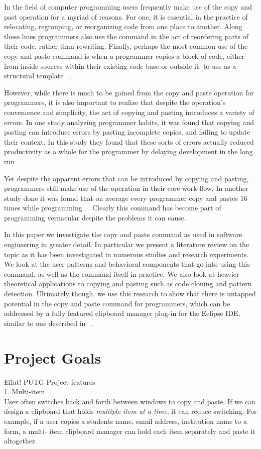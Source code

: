 \documentclass{acm_proc_article-sp}
\begin{document}
In the field of computer programming users frequently make use of the copy and past operation for a myriad of reasons. For one, it is essential in the practice of relocating, regrouping, or reorganizing code from one place to another. Along these lines programmers also use the command in the act of reordering parts of their code, rather than rewriting. Finally, perhaps the most common use of the copy and paste command is when a programmer copies a block of code, either from inside sources within their existing code base or outside it, to use as a structural template ~\cite{ooplCP}.

However, while there is much to be gained from the copy and paste operation for programmers, it is also important to realize that despite the operation's convenience and simplicity, the act of copying and pasting introduces a variety of errors. In one study analyzing programmer habits, it was found that copying and pasting can introduce errors by pasting incomplete copies, and failing to update their context. In this study they found that these sorts of errors actually reduced productivity as a whole for the programmer by delaying development in the long run ~\cite{maintenenceStudy}

Yet despite the apparent errors that can be introduced by copying and pasting, programmers still make use of the operation in their core work-flow. In another study done it was found that on average every programmer copy and pastes 16 times while programming ~\cite{ooplCP}. Clearly this command has become part of programming vernacular despite the problems it can cause.

In this paper we investigate the copy and paste command as used in software engineering in greater detail. In particular we present a literature review on the topic as it has been investigated in numerous studies and research experiments. We look at the user patterns and behavioral components that go into using this command, as well as the command itself in practice. We also look at heavier theoretical applications to copying and pasting such as code cloning and pattern detection. Ultimately though, we use this research to show that there is untapped potential in the copy and paste command for programmers, which can be addressed by a fully featured clipboard manager plug-in for the Eclipse IDE, similar to one described in ~\cite{ooplCP}.

\section{Project Goals}
Effat!
PUTG
Project features
\\
1. Multi-item\\
 User often switches back and forth between windows to copy and paste. If we can design a clipboard that holds \textit{ multiple item at a time}, it can reduce switching. For example, if a user copies a students name, email address, institution name to a form, a multi- item clipboard manager can hold each item separately and paste it altogether. \\
 
\end{document}
